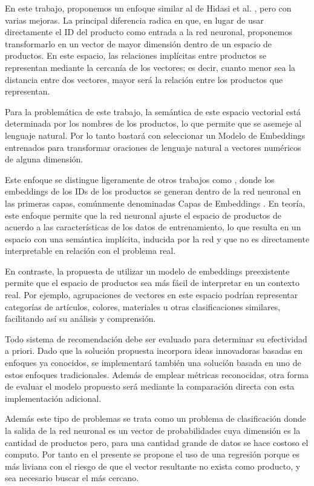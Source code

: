 \documentclass[runningheads]{llncs}
\begin{document}
En este trabajo, proponemos un enfoque similar al de Hidasi et al. \cite{hidasi2016session}, pero con varias mejoras. La principal diferencia radica en que, en lugar de usar directamente el ID del producto como entrada a la red neuronal, proponemos transformarlo en un vector de mayor dimensión dentro de un espacio de productos. En este espacio, las relaciones implícitas entre productos se representan mediante la cercanía de los vectores; es decir, cuanto menor sea la distancia entre dos vectores, mayor será la relación entre los productos que representan.

Para la problemática de este trabajo, la semántica de este espacio vectorial está determinada por los nombres de los productos, lo que permite que se asemeje al lenguaje natural. Por lo tanto bastará con seleccionar un Modelo de Embeddings entrenados para transformar oraciones de lenguaje natural a vectores numéricos de alguna dimensión.

Este enfoque se distingue ligeramente de otros trabajos como , donde los embeddings de los IDs de los productos se generan dentro de la red neuronal en las primeras capas, comúnmente denominadas Capas de Embeddings . En teoría, este enfoque permite que la red neuronal ajuste el espacio de productos de acuerdo a las características de los datos de entrenamiento, lo que resulta en un espacio con una semántica implícita, inducida por la red y que no es directamente interpretable en relación con el problema real.

En contraste, la propuesta de utilizar un modelo de embeddings preexistente permite que el espacio de productos sea más fácil de interpretar en un contexto real. Por ejemplo, agrupaciones de vectores en este espacio podrían representar categorías de artículos, colores, materiales u otras clasificaciones similares, facilitando así su análisis y comprensión.

Todo sistema de recomendación debe ser evaluado para determinar su efectividad a priori. Dado que la solución propuesta incorpora ideas innovadoras basadas en enfoques ya conocidos, se implementará también una solución basada en uno de estos enfoques tradicionales. Además de emplear métricas reconocidas, otra forma de evaluar el modelo propuesto será mediante la comparación directa con esta implementación adicional.

Además  este tipo de problemas se trata como un problema de clasificación donde la salida de la red neuronal es un vector de probabilidades cuya dimensión es la cantidad de productos pero, para una cantidad grande de datos se hace costoso el computo. Por tanto en el presente se propone el uso de una regresión porque es más liviana con el riesgo de que el vector resultante no exista como producto, y sea necesario buscar el más cercano.
\end{document}
